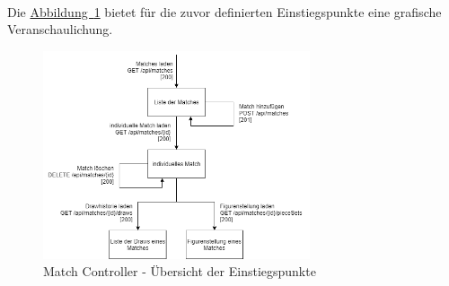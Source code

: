 \\
Die \hyperref[fig:matchController]{Abbildung~\ref{fig:matchController}} bietet für die zuvor definierten Einstiegspunkte eine grafische Veranschaulichung.
\begin{figure}[htb]
	\includegraphics[width=0.7\textwidth]{images/match-controller.png}
	\caption{Match Controller - Übersicht der Einstiegspunkte}
	\label{fig:matchController}
\end{figure}

